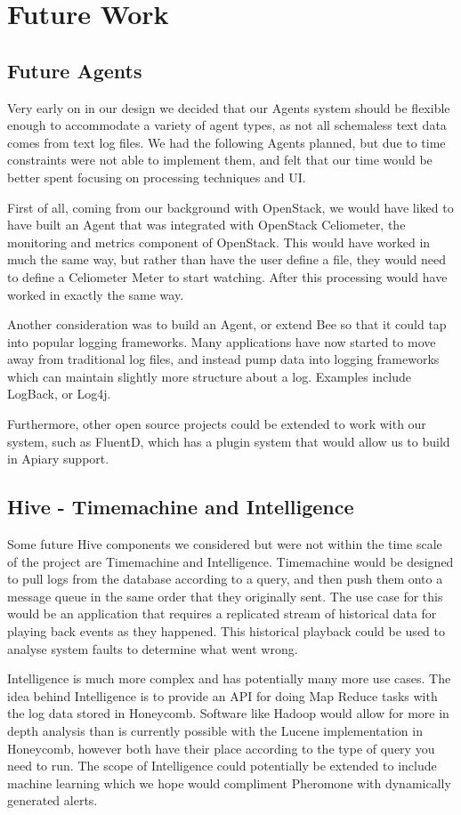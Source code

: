 \section{Future Work}

\subsection{Future Agents}

Very early on in our design we decided that our Agents system should be
flexible enough to accommodate a variety of agent types, as not all schemaless
text data comes from text log files. We had the following Agents planned, but
due to time constraints were not able to implement them, and felt that our time
would be better spent focusing on processing techniques and UI.

First of all, coming from our background with OpenStack, we would have liked to
have built an Agent that was integrated with OpenStack Celiometer, the
monitoring and metrics component of OpenStack. This would have worked in much
the same way, but rather than have the user define a file, they would need to
define a Celiometer Meter to start watching. After this processing would have
worked in exactly the same way.

Another consideration was to build an Agent, or extend Bee so that it could tap
into popular logging frameworks. Many applications have now started to move
away from traditional log files, and instead pump data into logging frameworks
which can maintain slightly more structure about a log. Examples include
LogBack, or Log4j.

Furthermore, other open source projects could be extended to work with our
system, such as FluentD, which has a plugin system that would allow us to build
in Apiary support.

\subsection{Hive - Timemachine and Intelligence}

Some future Hive components we considered but were not within the time scale of
the project are Timemachine and Intelligence. Timemachine would be designed to
pull logs from the database according to a query, and then push them onto a
message queue in the same order that they originally sent. The use case for
this would be an application that requires a replicated stream of historical
data for playing back events as they happened. This historical playback could
be used to analyse system faults to determine what went wrong.

Intelligence is much more complex and has potentially many more use cases. The
idea behind Intelligence is to provide an API for doing Map Reduce tasks with
the log data stored in Honeycomb. Software like Hadoop would allow for more in
depth analysis than is currently possible with the Lucene implementation in
Honeycomb, however both have their place according to the type of query you
need to run. The scope of Intelligence could potentially be extended to include
machine learning which we hope would compliment Pheromone with dynamically
generated alerts.
